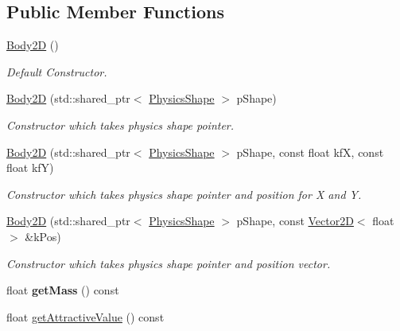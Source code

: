\subsection*{Public Member Functions}
\begin{DoxyCompactItemize}
\item 
\hypertarget{class_body2_d_a41ad3e71b95dfc818b91a19ae091b5d9}{\hyperlink{class_body2_d_a41ad3e71b95dfc818b91a19ae091b5d9}{Body2\+D} ()}\label{class_body2_d_a41ad3e71b95dfc818b91a19ae091b5d9}

\begin{DoxyCompactList}\small\item\em Default Constructor. \end{DoxyCompactList}\item 
\hyperlink{class_body2_d_add81f8b764cd0903ad01685edf56665e}{Body2\+D} (std\+::shared\+\_\+ptr$<$ \hyperlink{class_physics_shape}{Physics\+Shape} $>$ p\+Shape)
\begin{DoxyCompactList}\small\item\em Constructor which takes physics shape pointer. \end{DoxyCompactList}\item 
\hyperlink{class_body2_d_a0ea7045a305603b7cd38dfc5f611ebc9}{Body2\+D} (std\+::shared\+\_\+ptr$<$ \hyperlink{class_physics_shape}{Physics\+Shape} $>$ p\+Shape, const float kf\+X, const float kf\+Y)
\begin{DoxyCompactList}\small\item\em Constructor which takes physics shape pointer and position for X and Y. \end{DoxyCompactList}\item 
\hyperlink{class_body2_d_a30838f1b90c3273d8c75ed815eaacb53}{Body2\+D} (std\+::shared\+\_\+ptr$<$ \hyperlink{class_physics_shape}{Physics\+Shape} $>$ p\+Shape, const \hyperlink{class_vector2_d}{Vector2\+D}$<$ float $>$ \&k\+Pos)
\begin{DoxyCompactList}\small\item\em Constructor which takes physics shape pointer and position vector. \end{DoxyCompactList}\item 
\hypertarget{class_body2_d_ade39c095deccf7df714b42f64af3c00e}{float {\bfseries get\+Mass} () const }\label{class_body2_d_ade39c095deccf7df714b42f64af3c00e}

\item 
\hypertarget{class_body2_d_a5c24fc01e7288f03b1b64b254a752cb8}{float \hyperlink{class_body2_d_a5c24fc01e7288f03b1b64b254a752cb8}{get\+Attractive\+Value} () const }\label{class_body2_d_a5c24fc01e7288f03b1b64b254a752cb8}


\end{DoxyCompactItemize}
